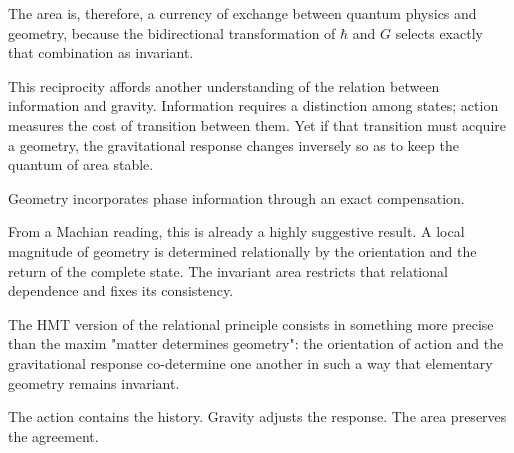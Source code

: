The area is, therefore, a currency of exchange between quantum physics and geometry, because the bidirectional transformation of \(\hbar\) and \(G\) selects exactly that combination as invariant.\par

This reciprocity affords another understanding of the relation between information and gravity. Information requires a distinction among states; action measures the cost of transition between them. Yet if that transition must acquire a geometry, the gravitational response changes inversely so as to keep the quantum of area stable.\par

Geometry incorporates phase information through an exact compensation.\par

From a Machian reading, this is already a highly suggestive result. A local magnitude of geometry is determined relationally by the orientation and the return of the complete state. The invariant area restricts that relational dependence and fixes its consistency.\par

The HMT version of the relational principle consists in something more precise than the maxim "matter determines geometry": the orientation of action and the gravitational response co-determine one another in such a way that elementary geometry remains invariant.\par

The action contains the history. Gravity adjusts the response. The area preserves the agreement.\par

